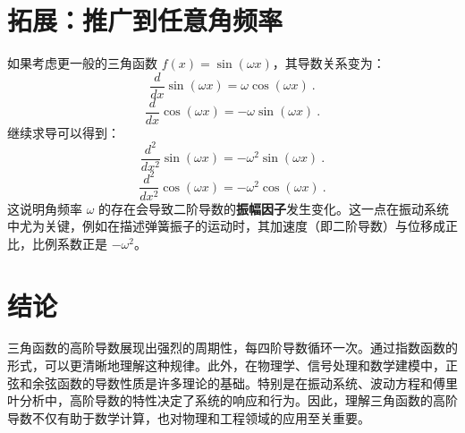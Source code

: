 \section{拓展：推广到任意角频率}
如果考虑更一般的三角函数 $f(x) = \sin(\omega x)$，其导数关系变为：
\[
\frac{d}{dx} \sin(\omega x) = \omega \cos(\omega x)~.
\]
\[
\frac{d}{dx} \cos(\omega x) = -\omega \sin(\omega x)~.
\]
继续求导可以得到：
\[
\frac{d^2}{dx^2} \sin(\omega x) = -\omega^2 \sin(\omega x)~.
\]
\[
\frac{d^2}{dx^2} \cos(\omega x) = -\omega^2 \cos(\omega x)~.
\]
这说明角频率 $\omega$ 的存在会导致二阶导数的\textbf{振幅因子}发生变化。这一点在振动系统中尤为关键，例如在描述弹簧振子的运动时，其加速度（即二阶导数）与位移成正比，比例系数正是 $-\omega^2$。

\section{结论}
三角函数的高阶导数展现出强烈的周期性，每四阶导数循环一次。通过指数函数的形式，可以更清晰地理解这种规律。此外，在物理学、信号处理和数学建模中，正弦和余弦函数的导数性质是许多理论的基础。特别是在振动系统、波动方程和傅里叶分析中，高阶导数的特性决定了系统的响应和行为。因此，理解三角函数的高阶导数不仅有助于数学计算，也对物理和工程领域的应用至关重要。
